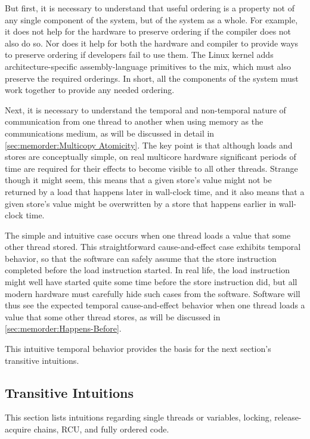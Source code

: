 But first, it is necessary to understand that useful ordering is a
property not of any single component of the system, but of the system
as a whole.
For example, it does not help for the hardware to preserve ordering if
the compiler does not also do so.
Nor does it help for both the hardware and compiler to provide ways
to preserve ordering if developers fail to use them.
The Linux kernel adds architecture-specific assembly-language primitives
to the mix, which must also preserve the required orderings.
In short, all the components of the system must work together to provide
any needed ordering.

Next, it is necessary to understand the temporal and non-temporal
nature of communication from one thread to another when using memory
as the communications medium, as will be discussed in detail in
\cref{sec:memorder:Multicopy Atomicity}.
The key point is that although loads and stores are conceptually simple,
on real multicore hardware significant periods of time are required for
their effects to become visible to all other threads.
Strange though it might seem, this means that a given store's value
might not be returned by a load that happens later in wall-clock time,
and it also means that a given store's value might be overwritten by a
store that happens earlier in wall-clock time.

The simple and intuitive case occurs when one thread loads a value that
some other thread stored.
This straightforward cause-and-effect case exhibits temporal behavior, so
that the software can safely assume that the store instruction completed
before the load instruction started.
In real life, the load instruction might well have started quite some
time before the store instruction did, but all modern hardware must
carefully hide such cases from the software.
Software will thus see the expected temporal cause-and-effect
behavior when one thread loads a value that some other thread stores,
as will be discussed in \cref{sec:memorder:Happens-Before}.

This intuitive temporal behavior provides the basis for the next section's
transitive intuitions.

\subsection{Transitive Intuitions}
\label{sec:memorder:Transitive Intuitions}

This section lists intuitions regarding single threads or variables,
locking, release-acquire chains, RCU, and fully ordered code.

